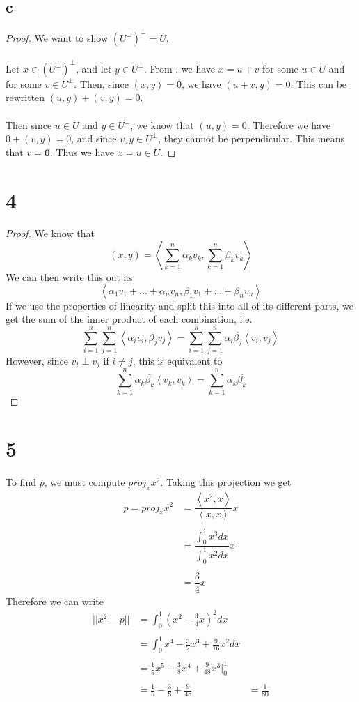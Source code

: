 \documentclass{article}
\begin{document}
\subsection*{c}
\begin{proof}
We want to show $(U^{\perp})^{\perp} = U$. \\\\
Let $x \in (U^{\perp})^{\perp}$, and let $y \in U^{\perp}$. From , we have $x = u + v$ for some $u \in U$ and for some $v \in U^{\perp}$. Then, since $(x, y) = 0$, we have $(u+v, y) = 0$. This can be rewritten $(u,y) + (v,y) = 0$. \\\\ 
Then since $u \in U$ and $y \in U^{\perp}$, we know that $(u,y) = 0$. Therefore we have $0 + (v,y) = 0$, and since $v,y \in U^{\perp}$, they cannot be perpendicular. This means that $v = \mathbf{0}$. Thus we have $x = u \in U$. \end{proof}

\section*{4}
\begin{proof}
We know that 
\[ (x,y) = \left<\sum_{k=1}^n \alpha_kv_k, \sum_{k=1}^n \beta_k v_k\right>\]
We can then write this out as 
\[ \left< \alpha_1v_1 + \dots + \alpha_nv_n, \beta_1v_1 + \dots + \beta_nv_n\right> \]
If we use the properties of linearity and split this into all of its different parts, we get the sum of the inner product of each combination, i.e.
\[ \sum_{i=1}^n \sum_{j=1}^n \left< \alpha_iv_i,\beta_jv_j\right> = \sum_{i=1}^n \sum_{j=1}^n \alpha_i\overline{\beta_j}\left< v_i,v_j\right> \]
However, since $v_i \perp v_j$ if $i \neq j$, this is equivalent to 
\[ \sum_{k=1}^n \alpha_k\overline{\beta_k}\left<v_k,v_k\right> = \sum_{k=1}^n\alpha_k\overline{\beta_k} \]

\end{proof}

\section*{5}
To find $p$, we must compute $proj_xx^2$. Taking this projection we get
\begin{align*} p = proj_xx^2 & =\dfrac{\left<x^2,x\right>}{\left<x,x\right>}x\\\\
& = \dfrac{\int_0^1x^3dx}{\int_0^1x^2dx}x \\\\
& = \dfrac{3}{4}x
\end{align*}
Therefore we can write 
\begin{align*}
 ||x^2 - p|| &= \int_0^1 \left(x^2-\frac{3}{4}x\right)^2 dx \\\\
 &= \int_0^1 x^4 - \frac{3}{2}x^3 + \frac{9}{16}x^2 dx \\\\
 &=\frac{1}{5}x^5 - \frac{3}{8}x^4 + \frac{9}{48}x^3 \bigg|_0^1 \\\\
 &= \frac{1}{5} - \frac{3}{8} + \frac{9}{48}
 &= \frac{1}{80}
 \end{align*}
\end{document}
